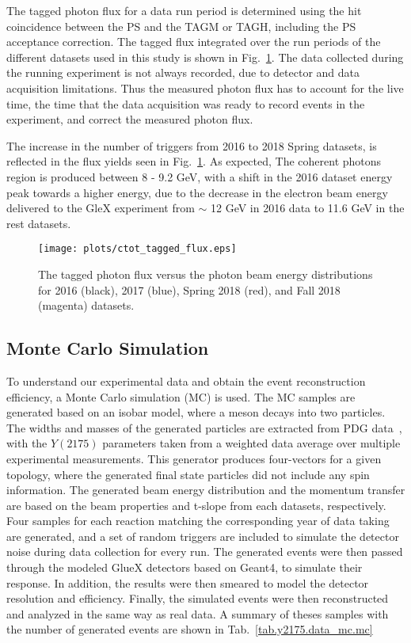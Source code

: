 The tagged photon flux for a data run period is determined using the hit coincidence between the PS and the TAGM or TAGH, including the PS acceptance correction. The tagged flux integrated over the run periods of the different datasets used in this study is shown in Fig.~\ref{fig.y2175.data_mc.data_tag_flux}. The data collected during the running experiment  is not always recorded, due to detector and data acquisition limitations. Thus the measured photon flux has to account for the live time, the time that the data acquisition was ready to record events in the experiment, and correct the measured photon flux.
~\par The increase in the number of triggers from 2016 to 2018 Spring datasets, is reflected in the flux yields seen in Fig.~\ref{fig.y2175.data_mc.data_tag_flux}. As expected, The coherent photons region is produced between 8 - 9.2 GeV, with a shift in the 2016 dataset energy peak towards a higher energy, due to the decrease in the electron beam energy delivered to the GleX experiment from $\sim$ 12 GeV in 2016 data to 11.6 GeV in the rest datasets.

\begin{figure}[H]
    \centering
    \texttt{[image: plots/ctot\_tagged\_flux.eps]}
    \caption{\label{fig.y2175.data_mc.data_tag_flux}The tagged photon flux versus the photon beam energy distributions for 2016 (black), 2017 (blue), Spring 2018 (red), and Fall 2018 (magenta) datasets.}
\end{figure}

\subsection{Monte Carlo Simulation}
\label{chap.y2175.data_mc.mc}

To understand our experimental data and obtain the event reconstruction efficiency, a Monte Carlo simulation (MC) is used. The MC samples are generated based on an isobar model, where a meson decays into two particles. The widths and masses of the generated particles are extracted from PDG data~\cite{Tanabashi18}, with the $Y(2175)$ parameters taken from a weighted data average over multiple experimental measurements. This generator produces four-vectors for a given topology, where the generated final state particles did not include any spin information. The generated beam energy distribution and the momentum transfer are based on the beam properties and t-slope from each datasets, respectively. Four samples for each reaction matching the corresponding year of data taking are generated, and a set of random triggers are included to simulate the detector noise during data collection for every run. The generated events were then passed through the modeled GlueX detectors based on Geant4, to simulate their response. In addition, the results were then smeared to model the detector resolution and efficiency. Finally, the simulated events were then reconstructed and analyzed in the same way as real data. A summary of theses samples with the number of generated events are shown in Tab.~\ref{tab.y2175.data_mc.mc}   

